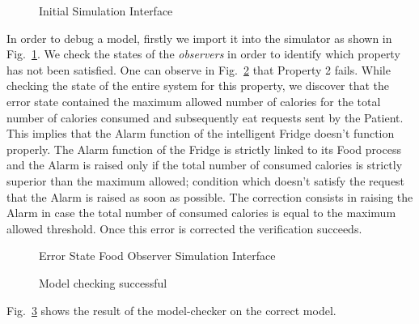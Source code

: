 \documentclass[a4paper,twoside]{article}
\begin{document}



\begin{figure}[!h]
  \centering
  {}
  \caption{Initial Simulation Interface}
  \label{fig:initialsimulationinterface}
 \end{figure}

In order to  debug  a model, firstly we import it into the simulator as shown in Fig.~\ref{fig:initialsimulationinterface}. We check the states of the \textit{observers} in order to identify which property has not been satisfied. One can observe in Fig.~\ref{fig:errorstatefoodobserver} that Property 2 fails. While checking the state of the entire system for this property, we discover that the error state contained the maximum allowed number of calories for the total number of calories consumed and subsequently eat requests sent by the Patient. This implies that the Alarm function of the intelligent Fridge doesn't function properly. The Alarm function of the Fridge is strictly linked to its Food process and the Alarm is raised only if the total number of consumed calories is strictly superior than the maximum allowed; condition which doesn't satisfy the request that the Alarm is raised as soon as possible. The correction consists in raising the Alarm in case the total number of consumed calories is equal to the maximum allowed threshold. Once this error is corrected the verification succeeds.


\begin{figure}[!h]
  \centering
  {}
  \caption{Error State Food Observer Simulation Interface}
  \label{fig:errorstatefoodobserver}
 \end{figure}

\begin{figure}[!h]
  \centering
  {}
  \caption{Model checking successful}
  \label{fig:verificationok}
 \end{figure} 

Fig.~\ref{fig:verificationok} shows the result of the model-checker on the correct model.
\end{document}
